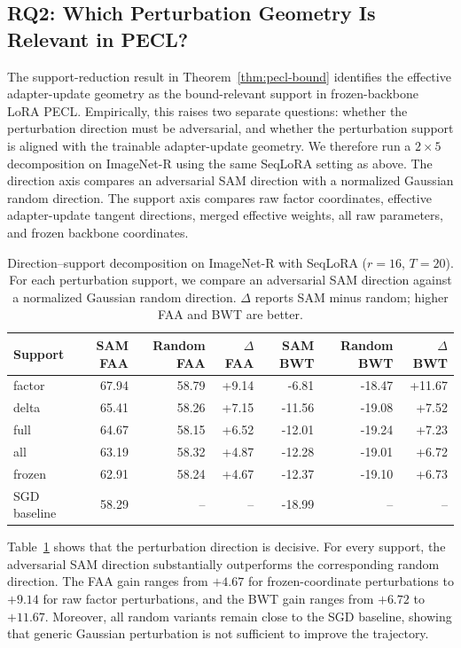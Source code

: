 \documentclass{article}
\begin{document}
\subsection{RQ2: Which Perturbation Geometry Is Relevant in PECL?}
\label{sec:rq2_geometry}

The support-reduction result in Theorem~\ref{thm:pecl-bound} identifies the effective adapter-update geometry as the bound-relevant support in frozen-backbone LoRA PECL.
Empirically, this raises two separate questions: whether the perturbation direction must be adversarial, and whether the perturbation support is aligned with the trainable adapter-update geometry.
We therefore run a $2\times5$ decomposition on ImageNet-R using the same SeqLoRA setting as above.
The direction axis compares an adversarial SAM direction with a normalized Gaussian random direction.
The support axis compares raw factor coordinates, effective adapter-update tangent directions, merged effective weights, all raw parameters, and frozen backbone coordinates.

\begin{table}[t]
\centering
\small
\setlength{\tabcolsep}{4.0pt}
\caption{Direction--support decomposition on ImageNet-R with SeqLoRA ($r=16$, $T=20$).
For each perturbation support, we compare an adversarial SAM direction against a normalized Gaussian random direction.
$\Delta$ reports SAM minus random; higher FAA and BWT are better.
}
\label{tab:support_direction}
\begin{tabular}{lrrrrrr}
\toprule
Support & SAM FAA & Random FAA & $\Delta$ FAA & SAM BWT & Random BWT & $\Delta$ BWT \\
\midrule
factor & 67.94 & 58.79 & +9.14 & -6.81 & -18.47 & +11.67 \\
delta  & 65.41 & 58.26 & +7.15 & -11.56 & -19.08 & +7.52 \\
full   & 64.67 & 58.15 & +6.52 & -12.01 & -19.24 & +7.23 \\
all    & 63.19 & 58.32 & +4.87 & -12.28 & -19.01 & +6.72 \\
frozen & 62.91 & 58.24 & +4.67 & -12.37 & -19.10 & +6.73 \\
\midrule
SGD baseline & 58.29 & -- & -- & -18.99 & -- & -- \\
\bottomrule
\end{tabular}
\end{table}

Table~\ref{tab:support_direction} shows that the perturbation direction is decisive.
For every support, the adversarial SAM direction substantially outperforms the corresponding random direction.
The FAA gain ranges from $+4.67$ for frozen-coordinate perturbations to $+9.14$ for raw factor perturbations, and the BWT gain ranges from $+6.72$ to $+11.67$.
Moreover, all random variants remain close to the SGD baseline, showing that generic Gaussian perturbation is not sufficient to improve the trajectory.
\end{document}
